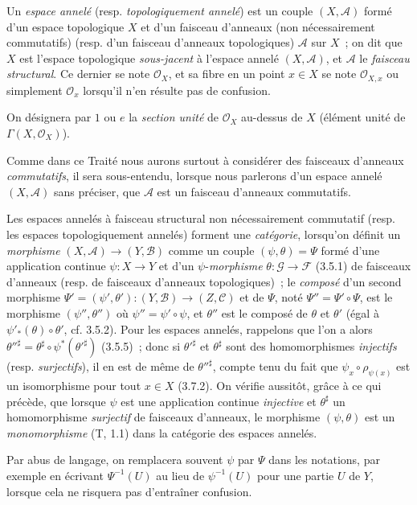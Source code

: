 \begin{env}[4.1.1]
\label{0.4.1.1-fr}
Un \emph{espace annelé} (resp. \emph{topologiquement annelé}) est un couple
$(X,\mathcal{A})$ formé d'un espace topologique $X$ et d'un faisceau d'anneaux
(non nécessairement commutatifs) (resp. d'un faisceau d'anneaux topologiques)
$\mathcal{A}$ sur $X$~; on dit que $X$ est l'espace
topologique \emph{sous-jacent} à l'espace annelé $(X,\mathcal{A})$, et
$\mathcal{A}$ le \emph{faisceau structural}. Ce dernier se note
$\mathcal{O}_X$, et sa fibre en un point $x\in X$ se note $\mathcal{O}_{X,x}$
ou simplement $\mathcal{O}_x$ lorsqu'il n'en résulte pas de confusion.

On désignera par $1$ ou $e$ la \emph{section unité} de $\mathcal{O}_X$
au-dessus de $X$ (élément unité de $\Gamma(X,\mathcal{O}_X)$).

Comme dans ce Traité nous aurons surtout à considérer des faisceaux d'anneaux
\emph{commutatifs}, il sera sous-entendu, lorsque nous parlerons d'un espace
annelé $(X,\mathcal{A})$ sans préciser, que $\mathcal{A}$ est un faisceau
d'anneaux commutatifs.

Les espaces annelés à faisceau structural non nécessairement commutatif
(resp. les espaces topologiquement annelés) forment une \emph{catégorie},
lorsqu'on définit un \emph{morphisme}
$(X,\mathcal{A})\to(Y,\mathcal{B})$ comme un couple
$(\psi,\theta)=\Psi$ formé d'une application continue $\psi:X\to Y$ et d'un
$\psi$-\emph{morphisme} $\theta:\mathcal{G}\to\mathcal{F}$ (3.5.1) de
faisceaux d'anneaux (resp. de faisceaux d'anneaux topologiques)~; le
\emph{composé} d'un second morphisme
$\Psi'=(\psi',\theta'):(Y,\mathcal{B})\to(Z,\mathcal{C})$ et de $\Psi$, noté
$\Psi''=\Psi'\circ\Psi$, est le morphisme $(\psi'',\theta'')$ où
$\psi''=\psi'\circ\psi$, et $\theta''$ est le composé de $\theta$ et $\theta'$
(égal à $\psi'_*(\theta)\circ\theta'$, cf. 3.5.2). Pour les espaces
annelés, rappelons que l'on a alors
$\theta''^\sharp=\theta^\sharp\circ\psi^*(\theta'^\sharp)$ (3.5.5)~; donc si
$\theta'^\sharp$ et $\theta^\sharp$ sont des homomorphismes \emph{injectifs}
(resp. \emph{surjectifs}), il en est de même de $\theta''^\sharp$, compte tenu
du fait que $\psi_x\circ\rho_{\psi(x)}$ est un isomorphisme pour tout $x\in X$
(3.7.2). On vérifie aussitôt, grâce à ce qui précède, que lorsque $\psi$
est une application continue \emph{injective} et $\theta^\sharp$ un
homomorphisme \emph{surjectif} de faisceaux d'anneaux, le morphisme
$(\psi,\theta)$ est un \emph{monomorphisme} (T, 1.1) dans la catégorie des
espaces annelés.

Par abus de langage, on remplacera souvent $\psi$ par $\Psi$ dans les
notations, par exemple en écrivant $\Psi^{-1}(U)$ au lieu de $\psi^{-1}(U)$
pour une partie $U$ de $Y$, lorsque cela ne risquera pas d'entraîner confusion.
\end{env}

